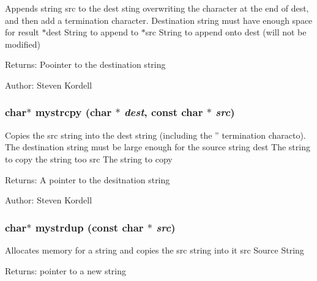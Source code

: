 Appends string src to the dest sting overwriting the  character at the end of dest, and then add a termination  character. Destination string must have enough space for result  $\ast$dest String to append to  $\ast$src String to append onto dest (will not be modified) \begin{Desc}
\item[Returns:]Poointer to the destination string \end{Desc}
\begin{Desc}
\item[Author:]Steven Kordell \end{Desc}
\subsubsection{\setlength{\rightskip}{0pt plus 5cm}char$\ast$ mystrcpy (char $\ast$ {\em dest}, const char $\ast$ {\em src})}\label{mystringbackup_8c_904b16ff21c3142202e139a3ac79e19a}


Copies the src string into the dest string (including the '' termination characto). The destination string must be large enough for the source string  dest The string to copy the string too  src The string to copy \begin{Desc}
\item[Returns:]A pointer to the desitnation string \end{Desc}
\begin{Desc}
\item[Author:]Steven Kordell \end{Desc}
\subsubsection{\setlength{\rightskip}{0pt plus 5cm}char$\ast$ mystrdup (const char $\ast$ {\em src})}\label{mystringbackup_8c_e4d69f24eeedc25d4a7abe09f6656cc2}


Allocates memory for a string and copies the src string into it  src Source String \begin{Desc}
\item[Returns:]pointer to a new string \end{Desc}
